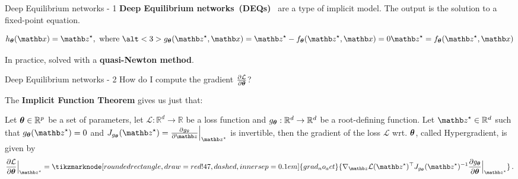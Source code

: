 \begin{frame}{Deep Equilibrium networks - 1}
    \textbf{Deep Equilibrium networks~(DEQs)}~\citep{Bai2019DeepModels} are a type of implicit model.
    The output is the solution to a fixed-point equation.

    \begin{equation*}
        h_{\thetab}(\xb) = \zb^\star, \text{ where } \alt<3>{g_\thetab(\zb^\star, \xb) = \zb^\star - f_\thetab(\zb^\star, \xb) = 0}{\zb^\star = f_\thetab(\zb^\star, \xb)}
    \end{equation*}

    \pause

    In practice, solved with a \textbf{quasi-Newton method}.
\end{frame}

\begin{frame}{Deep Equilibrium networks - 2}
    How do I compute the gradient $\frac{\partial \mathcal{L}}{\partial {\ensuremath{\boldsymbol{\theta}}}}$?
    \pause

    The \textbf{Implicit Function Theorem} gives us just that:
    \begin{theorem}
        Let ${\boldsymbol{\theta}} \in \mathbb{R}^p$ be a set of parameters, let $\mathcal{L}: \mathbb{R}^d \rightarrow \mathbb{R}$ be a loss function and $g_{{\boldsymbol{\theta}}}: \mathbb{R}^d \rightarrow \mathbb{R}^d$ be a root-defining function.
Let $\zb^\star \in  \mathbb{R}^d$ such that $g_{\thetab}(\zb^\star) = 0$ and $J_{g_{\thetab}}(\zb^\star) = \frac{\partial g_{\theta}}{\partial \zb}\Bigr|_{\zb^\star}$ is invertible, then the gradient of the loss $\mathcal{L}$ wrt. ${\boldsymbol{\theta}}$, called Hypergradient, is given by
\begin{equation*}
    \frac{\partial \mathcal{L}}{\partial \thetab}\Bigr|_{\zb^\star} = \tikzmarknode[rounded rectangle, draw=red!47, dashed, inner sep=0.1em]{grad_no_act}{\nabla_\zb \mathcal{L}(\zb^\star)^\top J_{g_{\thetab}}(\zb^\star)^{-1} \frac{\partial g_{\thetab}}{\partial \thetab}\Bigr|_{\zb^\star}} \, .
\end{equation*}
    \end{theorem}
\end{frame}

